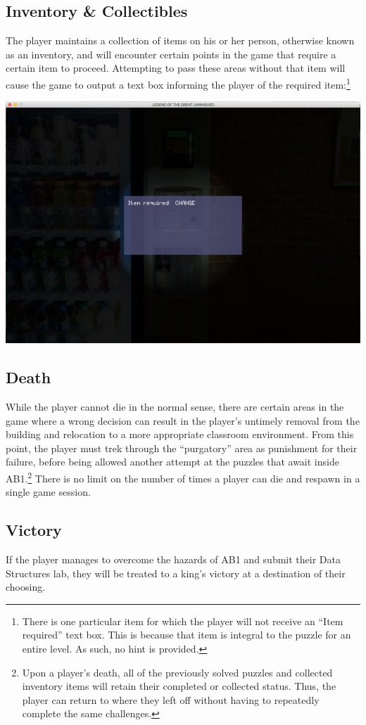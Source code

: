 \documentclass{article}
\begin{document}
	\subsection{Inventory \& Collectibles}
		The player maintains a collection of items on his or her person, otherwise known as an inventory, and will encounter certain points in the game that require a certain item to proceed. Attempting to pass these areas without that item will cause the game to output a text box informing the player of the required item:\footnote{There is one particular item for which the player will not receive an ``Item required'' text box. This is because that item is integral to the puzzle for an entire level. As such, no hint is provided.}
		\begin{center}
			\includegraphics[scale=0.3]{UMimages/invenDemo}
		\end{center}
	\subsection{Death}
		While the player cannot die in the normal sense, there are certain areas in the game where a wrong decision can result in the player's untimely removal from the building and relocation to a more appropriate classroom environment. From this point, the player must trek through the ``purgatory'' area as punishment for their failure, before being allowed another attempt at the puzzles that await inside AB1.\footnote{Upon a player's death, all of the previously solved puzzles and collected inventory items will retain their completed or collected status. Thus, the player can return to where they left off without having to repeatedly complete the same challenges.} There is no limit on the number of times a player can die and respawn in a single game session. 
	\subsection{Victory}
		If the player manages to overcome the hazards of AB1 and submit their Data Structures lab, they will be treated to a king's victory at a destination of their choosing. 
\end{document}
